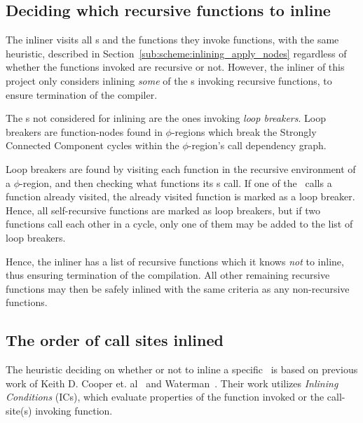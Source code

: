 \subsection{Deciding which recursive functions to inline}
\label{sub:scheme:inlining_recur_apply_nodes}

The inliner visits all \applyNode s and the functions they invoke functions,
with the same heuristic, described in
Section~\ref{sub:scheme:inlining_apply_nodes} regardless of whether the
functions invoked are recursive or not. However, the inliner of this project
only considers inlining \textit{some} of the \applyNode s invoking recursive
functions, to ensure termination of the compiler.

The \applyNode s not considered for inlining are the ones invoking \textit{loop
breakers}. Loop breakers are function-nodes found in $\phi$-regions which break
the Strongly Connected Component cycles within the $\phi$-region's call
dependency graph.

Loop breakers are found by visiting each function in the recursive environment
of a $\phi$-region, and then checking what functions its \applyNode s call. If
one of the \applyNode~calls a function already visited, the already visited
function is marked as a loop breaker. Hence, all self-recursive functions are
marked as loop breakers, but if two functions call each other in a cycle, only
one of them may be added to the list of loop breakers.


Hence, the inliner has a list of recursive functions which it knows \textit{not}
to inline, thus ensuring termination of the compilation. All other remaining
recursive functions may then be safely inlined with the same criteria as any
non-recursive functions.

\subsection{The order of call sites inlined}
\label{sub:scheme:ordering_apply_nodes}

The heuristic deciding on whether or not to inline a specific \applyNode~is
based on previous work of Keith D. Cooper et. al~\cite{AdaptvStratInlSubst} and
Waterman~\cite{AdaptvCompilAndInlingWaterman}. Their work utilizes
\textit{Inlining Conditions} (ICs), which evaluate properties of the function
invoked or the call-site(s) invoking function.

